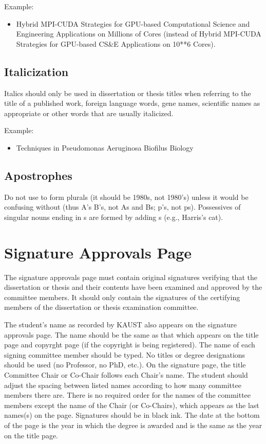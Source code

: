 Example:

\begin{itemize}
\item Hybrid MPI-CUDA Strategies for GPU-based Computational Science and
Engineering Applications on Millions of Cores (instead of Hybrid
MPI-CUDA Strategies for GPU-based CS\&E Applications on 10**6 Cores).

\end{itemize}

\subsection{Italicization}

Italics should only be used in dissertation or thesis titles when referring to the title of a published work, foreign language words, gene names, scientific names as appropriate or other words that are usually italicized.

Example:

\begin{itemize}
\item Techniques in Pseudomonas Aeruginosa Biofilus Biology

\end{itemize}

\subsection{Apostrophes}

Do not use to form plurals (it should be 1980s, not 1980's) unless it would be confusing without (thus A's B's, not As and Bs; p's, not ps).  Possessives of singular nouns ending in s are formed by adding s (e.g., Harris's cat).

\section{Signature Approvals Page}

The signature approvals page must contain original signatures verifying that the dissertation or thesis and their contents have been examined and approved by the committee members. It should only contain the signatures of the certifying members of the dissertation or thesis examination committee.

The student's name as recorded by KAUST also appears on the signature approvals page. The name should be the same as that which appears on the title page and copyrght page (if the copyright is being registered). The name of each signing committee member should be typed. No titles or degree designations should be used (no Professor, no PhD, etc.). On the signature page, the title Committee Chair or Co-Chair follows each Chair's name. The student should adjust the spacing between listed names according to how many committee members there are.  There is no required order for the names of the committee members except the name of the Chair (or Co-Chairs), which appears as the last names(s) on the page. Signatures should be in black ink. The date at the bottom of the page is the year in which the degree is awarded and is the same as the year on the title page.

